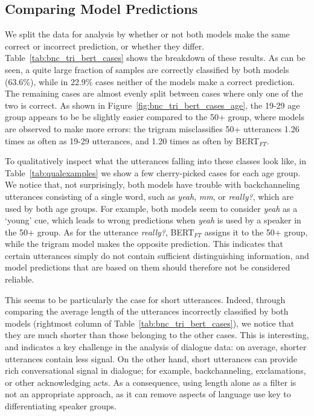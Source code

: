 \subsection{Comparing Model Predictions}
We split the data for analysis by whether or not both models make the same correct or incorrect prediction, or whether they differ. Table~\ref{tab:bnc_tri_bert_cases} shows the breakdown of these results.
As can be seen, a quite large fraction of samples are correctly classified by both models (63.6\%), while in 22.9\% cases neither of the models make a correct prediction. The remaining cases are almost evenly split between cases where only one of the two is correct. %
As shown in Figure~\ref{fig:bnc_tri_bert_cases_age}, the 19-29 age group appears to be be slightly easier compared to the 50+ group, where models are observed to make more errors: the trigram misclassifies 50+ utterances 1.26 times as often as 19-29 utterances, and 1.20 times as often by BERT$_{FT}$.

To qualitatively inspect what the utterances falling into these classes look like, in Table~\ref{tab:qualexamples} we show a few cherry-picked cases for each age group. 
We notice that, not surprisingly, both models have trouble with backchanneling utterances consisting of a single word, such as \emph{yeah}, \emph{mm}, or \emph{really?}, which are used by both age groups.
For example, both models seem to consider \emph{yeah} as a `young' cue, which leads to wrong predictions when \emph{yeah} is used by a speaker in the 50+ group. As for the utterance \emph{really?}, BERT$_{FT}$ assigns it to the 50+ group, while the trigram model makes the opposite prediction.
This indicates that certain utterances simply do not contain sufficient distinguishing information, and model predictions that are based on them should therefore not be considered reliable.

This seems to be particularly the case for short utterances. Indeed, through comparing the average length of the utterances incorrectly classified by both models (rightmost column of Table~\ref{tab:bnc_tri_bert_cases}), we notice that they are much shorter than those belonging to the other cases. This is interesting, and indicates a key challenge in the analysis of dialogue data: 
on average, shorter utterances contain less signal. On the other hand, short utterances can provide rich conversational signal in dialogue; for example, backchanneling, exclamations, or other acknowledging acts. As a consequence, using length alone as a filter is not an appropriate approach, as it can remove aspects of language use key to differentiating speaker groups.


